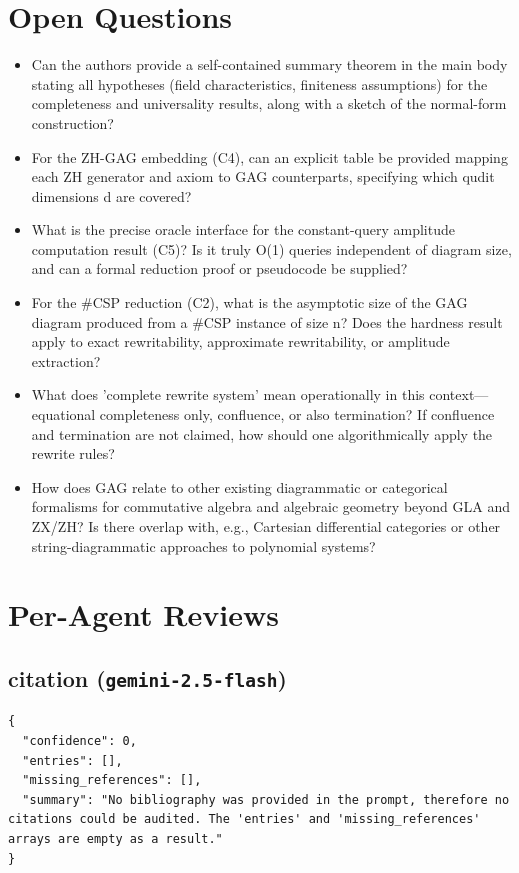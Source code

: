 \documentclass[11pt]{article}
\begin{document}
\section*{Open Questions}
\begin{itemize}[leftmargin=*]
  \item Can the authors provide a self-contained summary theorem in the main body stating all hypotheses (field characteristics, finiteness assumptions) for the completeness and universality results, along with a sketch of the normal-form construction?
  \item For the ZH-GAG embedding (C4), can an explicit table be provided mapping each ZH generator and axiom to GAG counterparts, specifying which qudit dimensions d are covered?
  \item What is the precise oracle interface for the constant-query amplitude computation result (C5)? Is it truly O(1) queries independent of diagram size, and can a formal reduction proof or pseudocode be supplied?
  \item For the \#CSP reduction (C2), what is the asymptotic size of the GAG diagram produced from a \#CSP instance of size n? Does the hardness result apply to exact rewritability, approximate rewritability, or amplitude extraction?
  \item What does 'complete rewrite system' mean operationally in this context—equational completeness only, confluence, or also termination? If confluence and termination are not claimed, how should one algorithmically apply the rewrite rules?
  \item How does GAG relate to other existing diagrammatic or categorical formalisms for commutative algebra and algebraic geometry beyond GLA and ZX/ZH? Is there overlap with, e.g., Cartesian differential categories or other string-diagrammatic approaches to polynomial systems?
\end{itemize}

\section*{Per-Agent Reviews}
\subsection*{citation (\texttt{gemini-2.5-flash})}
\begin{verbatim}
{
  "confidence": 0,
  "entries": [],
  "missing_references": [],
  "summary": "No bibliography was provided in the prompt, therefore no citations could be audited. The 'entries' and 'missing_references' arrays are empty as a result."
}
\end{verbatim}
\end{document}
